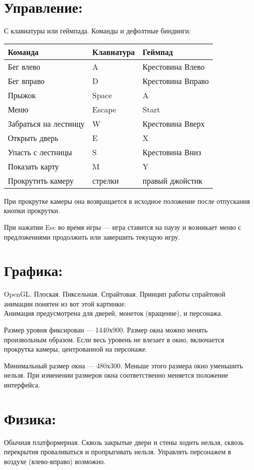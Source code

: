 \documentclass[12pt,a4paper]{article}
\begin{document}
\section{Управление:}
С клавиатуры или геймпада.
Команды и дефолтные биндинги:\\
\begin{tabular}{|p{6cm}|p{2.5cm}|p{3cm}|}
\hline
Команда & Клавиатура & Геймпад\\
\hline
Бег влево & A & Крестовина Влево \\
\hline
Бег вправо & D & Крестовина Вправо \\
\hline
Прыжок & Space & A \\
\hline
Меню & Escape & Start \\
\hline
Забраться на лестинцу & W & Крестовина Вверх \\
\hline
Открыть дверь & E & X \\
\hline
Упасть с лестницы & S & Крестовина Вниз \\
\hline
Показать карту & M & Y \\
\hline
Прокрутить камеру & стрелки & правый джойстик \\
\hline
\end{tabular}

При прокрутке камеры она возвращается в исходное положение после отпускания кнопки прокрутки.

При нажатии Esc во время игры --- игра ставится на паузу и возникает меню с предложениями продолжить или завершить текущую игру.
\section{Графика:}
OpenGL. Плоская. Пиксельная. Спрайтовая. Принцип работы спрайтовой анимации понятен из вот этой картинки:\\
Анимация предусмотрена для дверей, монеток (вращение), и персонажа.

Размер уровня фиксирован --- 1440х900. Размер окна можно менять произвольным образом. Если весь уровень не влезает в окно, включается прокрутка камеры, центрованной на персонаже.

Минимальный размер окна --- 480х300. Меньше этого размера окно уменьшить нельзя. При изменении размеров окна соответственно меняется положение интерфейса.
\section{Физика:}
Обычная платформерная. Сквозь закрытые двери и стены ходить нельзя, сквозь перекрытия проваливаться и пропрыгивать нельзя. Управлять персонажем в воздухе (влево-вправо) возможно.
\end{document}
